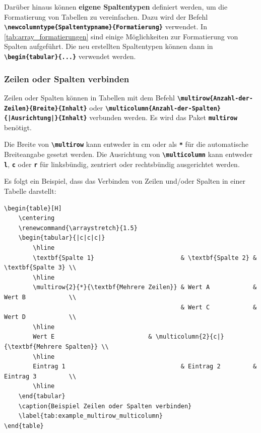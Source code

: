 Darüber hinaus können \textbf{eigene Spaltentypen} definiert werden, um die Formatierung von Tabellen zu vereinfachen. Dazu wird der Befehl \textbf{\texttt{\textbackslash newcolumntype\{Spaltentypname\}\{Formatierung\}}} verwendet. In \autoref{tab:array_formatierungen} sind einige Möglichkeiten zur Formatierung von Spalten aufgeführt. Die neu erstellten Spaltentypen können dann in \textbf{\texttt{\textbackslash begin\{tabular\}\{...\}}} verwendet werden.


\subsubsection{Zeilen oder Spalten verbinden}
Zeilen oder Spalten können in Tabellen mit dem Befehl \newline \textbf{\texttt{\textbackslash multirow\{Anzahl-der-Zeilen\}\{Breite\}\{Inhalt\}}} oder \newline \textbf{\texttt{\textbackslash multicolumn\{Anzahl-der-Spalten\}\{|Ausrichtung|\}\{Inhalt\}}} verbunden werden. Es wird das Paket \textbf{\texttt{multirow}} benötigt.

Die Breite von \textbf{\texttt{\textbackslash multirow}} kann entweder in cm oder als \textbf{\texttt{*}} für die automatische Breiteangabe gesetzt werden. Die Ausrichtung von \textbf{\texttt{\textbackslash multicolumn}} kann entweder \textbf{\texttt{l}}, \textbf{\texttt{c}} oder \textbf{\texttt{r}} für linksbündig, zentriert oder rechtsbündig ausgerichtet werden.

Es folgt ein Beispiel, dass das Verbinden von Zeilen und/oder Spalten in einer Tabelle darstellt:

\begin{lstlisting}[language={[LaTeX]TeX}, basicstyle=\scriptsize]
\begin{table}[H]
    \centering
    \renewcommand{\arraystretch}{1.5}
    \begin{tabular}{|c|c|c|}
        \hline
        \textbf{Spalte 1}                        & \textbf{Spalte 2} & \textbf{Spalte 3} \\
        \hline
        \multirow{2}{*}{\textbf{Mehrere Zeilen}} & Wert A            & Wert B            \\
                                                 & Wert C            & Wert D            \\
        \hline
        Wert E                          & \multicolumn{2}{c|}{\textbf{Mehrere Spalten}} \\
        \hline
        Eintrag 1                                & Eintrag 2         & Eintrag 3         \\
        \hline
    \end{tabular}
    \caption{Beispiel Zeilen oder Spalten verbinden}
    \label{tab:example_multirow_multicolumn}
\end{table}
\end{lstlisting}

